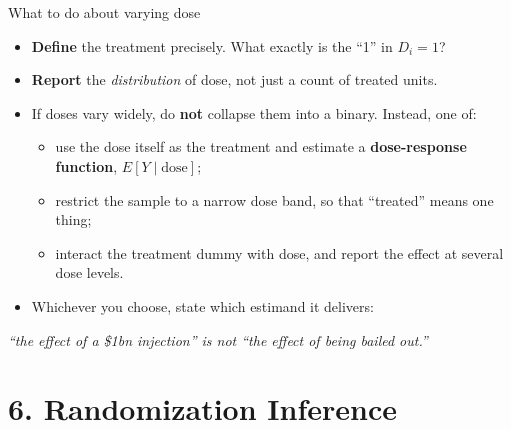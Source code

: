 \documentclass[
  11pt,
  ignorenonframetext,
  aspectratio=169,
]{beamer}
\providecommand{\tightlist}{%
  \setlength{\itemsep}{0pt}\setlength{\parskip}{0pt}}
\begin{document}
\begin{frame}{What to do about varying dose}
\protect{}\label{what-to-do-about-varying-dose}
\begin{itemize}
\tightlist
\item
  \textbf{Define} the treatment precisely. What exactly is the ``1'' in
  \(D_i = 1\)?
\item
  \textbf{Report} the \emph{distribution} of dose, not just a count of
  treated units.
\item
  If doses vary widely, do \textbf{not} collapse them into a binary.
  Instead, one of:

  \begin{itemize}
  \tightlist
  \item
    use the dose itself as the treatment and estimate a
    \textbf{dose-response function}, \(E[Y \mid \text{dose}]\);
  \item
    restrict the sample to a narrow dose band, so that ``treated'' means
    one thing;
  \item
    interact the treatment dummy with dose, and report the effect at
    several dose levels.
  \end{itemize}
\item
  Whichever you choose, state which estimand it delivers:
\end{itemize}

\begin{center}
\emph{``the effect of a \$1bn injection'' is not ``the effect of being bailed out.''}
\end{center}
\end{frame}

\section{6. Randomization Inference}\label{randomization-inference}
\end{document}
